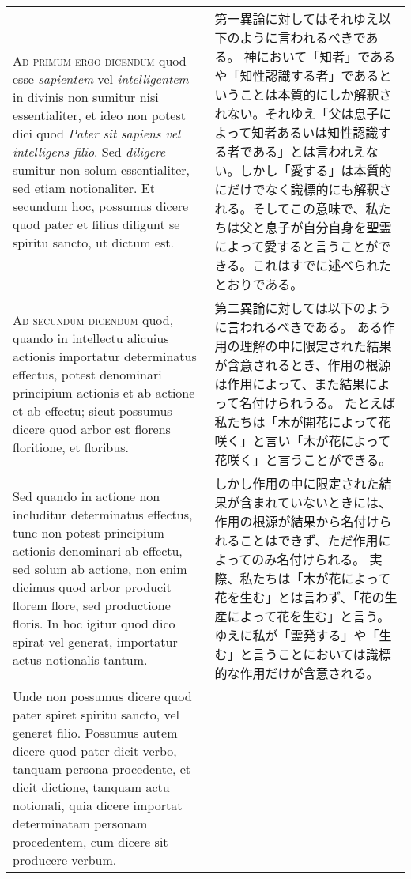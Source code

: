 \documentclass[10pt]{jsarticle} %
\begin{document}
\begin{longtable}{p{21em}p{21em}}
{\scshape Ad primum ergo dicendum} quod esse {\itshape sapientem} vel {\itshape intelligentem} in
 divinis non sumitur nisi essentialiter, et ideo non potest dici quod
 {\itshape Pater sit sapiens vel intelligens filio}. Sed {\itshape diligere} sumitur non
 solum essentialiter, sed etiam notionaliter. Et secundum hoc,
 possumus dicere quod pater et filius diligunt se spiritu sancto, ut
 dictum est.


&

第一異論に対してはそれゆえ以下のように言われるべきである。
神において「知者」であるや「知性認識する者」であるということは本質的にしか解釈されない。それゆえ「父は息子によって知者あるいは知性認識する者である」とは言われえない。しかし「愛する」は本質的にだけでなく識標的にも解釈される。そしてこの意味で、私たちは父と息子が自分自身を聖霊によって愛すると言うことができる。これはすでに述べられたとおりである。

\\

{\scshape Ad secundum dicendum} quod, quando in intellectu alicuius actionis
 importatur determinatus effectus, potest denominari principium
 actionis et ab actione et ab effectu; sicut possumus dicere quod
 arbor est florens floritione, et floribus. 

&

第二異論に対しては以下のように言われるべきである。
ある作用の理解の中に限定された結果が含意されるとき、作用の根源は作用によって、また結果によって名付けられうる。
たとえば私たちは「木が開花によって花咲く」と言い「木が花によって花咲く」と言うことができる。

\\


Sed quando in actione non
 includitur determinatus effectus, tunc non potest principium actionis
 denominari ab effectu, sed solum ab actione, non enim dicimus quod
 arbor producit florem flore, sed productione floris. In hoc igitur
 quod dico spirat vel generat, importatur actus notionalis tantum. 

&

しかし作用の中に限定された結果が含まれていないときには、作用の根源が結果から名付けられることはできず、ただ作用によってのみ名付けられる。
実際、私たちは「木が花によって花を生む」とは言わず、「花の生産によって花を生む」と言う。
ゆえに私が「霊発する」や「生む」と言うことにおいては識標的な作用だけが含意される。

\\


Unde non possumus dicere quod pater spiret spiritu sancto, vel generet
 filio. Possumus autem dicere quod pater dicit verbo, tanquam persona
 procedente, et dicit dictione, tanquam actu notionali, quia dicere
 importat determinatam personam procedentem, cum dicere sit producere
 verbum. 


\end{longtable}
\end{document}
